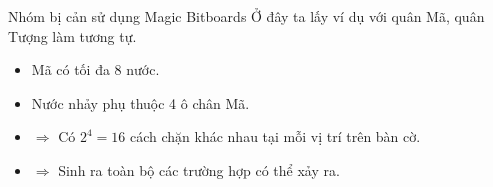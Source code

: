 \begin{frame}{Nhóm bị cản sử dụng Magic Bitboards}
  Ở đây ta lấy ví dụ với quân Mã, quân Tượng làm tương tự.
  \begin{itemize}[<+->]
    \item Mã có tối đa 8 nước.
    \item Nước nhảy phụ thuộc 4 ô chân Mã.
    \item $\Rightarrow$ Có $2^4=16$ cách chặn khác nhau tại mỗi vị trí trên bàn cờ.
    \item $\Rightarrow$ Sinh ra toàn bộ các trường hợp có thể xảy ra.
  \end{itemize}
\end{frame}


